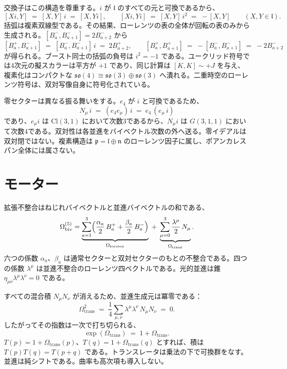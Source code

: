 \documentclass[a4paper]{article}
\begin{document}
交換子はこの構造を尊重する。\(i\) が \(\mathfrak{l}\) のすべての元と可換であるから、
\[
[Xi,Y] \;=\; [X,Y]\,i \;=\; [X,Yi],\qquad
[Xi,Yi] \;=\; [X,Y]\,i^{2} \;=\; -[X,Y]
\qquad(X,Y\in\mathfrak{l}).
\]
括弧は複素双線型である。その結果、ローレンツの表の全体が回転の表のみから生成される。\([B^{-}_{a},B^{-}_{a+1}]=2B^{-}_{a+2}\) から
\[
[B^{+}_{a},B^{-}_{a+1}] \;=\; [B^{-}_{a},B^{-}_{a+1}]\,i \;=\; 2B^{+}_{a+2},
\qquad
[B^{+}_{a},B^{+}_{a+1}] \;=\; -[B^{-}_{a},B^{-}_{a+1}] \;=\; -2B^{-}_{a+2}
\]
が得られる。ブースト同士の括弧の負号は \(i^{2}=-1\) である。ユークリッド符号では4次元の擬スカラーは平方が \(+1\) であり、同じ計算は \([K,K]\sim +J\) を与え、複素化はコンパクトな \(\mathfrak{so}(4)\cong\mathfrak{so}(3)\oplus\mathfrak{so}(3)\) へ潰れる。二重時空のローレンツ符号は、双対写像自身に符号化されている。

零セクターは異なる振る舞いをする。\(e_{4}\) が \(i\) と可換であるため、
\[
N_{\mu}\,i \;=\; (e_{4}e_{\mu})\,i \;=\; e_{4}\,(e_{\mu}\,i)
\]
であり、\(e_{\mu}i\) は \(\mathrm{Cl}(3,1)\) において次数3であるから、\(N_{\mu}i\) は \(G(3,1,1)\) において次数4である。双対性は各並進をバイベクトル次数の外へ送る。零イデアルは双対閉ではない。複素構造は \(\mathfrak{p}=\mathfrak{l}\oplus\mathfrak{n}\) のローレンツ因子に属し、ポアンカレスパン全体には属さない。

\section{モーター}
\label{sec:motors}

拡張不整合はねじれバイベクトルと並進バイベクトルの和である、
\begin{equation}
\Omega_{\mathrm{biv}}^{(5)}
= \underbrace{\sum_{a=1}^{3} \Bigl( \frac{\alpha_{a}}{2}\, B_{a}^{+} + \frac{\beta_{a}}{2}\, B_{a}^{-} \Bigr)}_{\Omega_{\mathrm{torsion}}}
\;+\;
\underbrace{\sum_{\mu=0}^{3} \frac{\lambda^{\mu}}{2}\, N_{\mu}}_{\Omega_{\mathrm{trans}}}.
\label{eq:Omega-decomp}
\end{equation}
六つの係数 \(\alpha_{a}\)、\(\beta_{a}\) は通常セクターと双対セクターのもとの不整合である。四つの係数 \(\lambda^{\mu}\) は並進不整合のローレンツ四ベクトルである。光的並進は錐 \(\eta_{\mu\nu}\lambda^{\mu}\lambda^{\nu}=0\) である。

すべての混合積 \(N_{\mu}N_{\nu}\) が消えるため、並進生成元は冪零である：
\[
\Omega_{\mathrm{trans}}^{2}
\;=\;
\frac{1}{4}\sum_{\mu,\nu}\lambda^{\mu}\lambda^{\nu}\,N_{\mu}N_{\nu}
\;=\; 0.
\]
したがってその指数は一次で打ち切られる、
\[
\exp(\Omega_{\mathrm{trans}}) \;=\; 1+\Omega_{\mathrm{trans}}.
\]
\(T(p)=1+\Omega_{\mathrm{trans}}(p)\)、\(T(q)=1+\Omega_{\mathrm{trans}}(q)\) とすれば、積は \(T(p)T(q)=T(p+q)\) である。トランスレータは乗法の下で可換群をなす。並進は純シフトである。曲率も高次項も導入しない。
\end{document}
